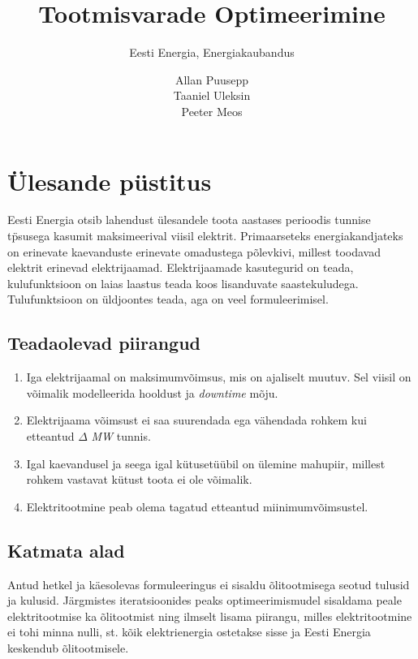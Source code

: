\documentclass[twosided, 11pt, a4paper]{article}
\title{Tootmisvarade Optimeerimine}
\subtitle{Eesti Energia, Energiakaubandus}
\author{Allan Puusepp \\ Taaniel Uleksin \\ Peeter Meos }
\begin{document}
\maketitle

\section{\"Ulesande p\"ustitus}
Eesti Energia otsib  lahendust \"ulesandele toota aastases perioodis tunnise t\"psusega kasumit maksimeerival viisil elektrit. Primaarseteks energiakandjateks on erinevate kaevanduste erinevate omadustega p\~olevkivi, millest toodavad elektrit erinevad elektrijaamad. Elektrijaamade kasutegurid on teada, kulufunktsioon on laias laastus teada koos lisanduvate saastekuludega. Tulufunktsioon on \"uldjoontes teada, aga on veel formuleerimisel.
\subsection{Teadaolevad piirangud}
\begin{enumerate}
\item Iga elektrijaamal on maksimumv\~oimsus, mis on ajaliselt muutuv. Sel viisil on v\~oimalik modelleerida hooldust ja \emph{downtime} m\~oju.
\item Elektrijaama v\~oimsust ei saa suurendada ega v\"ahendada rohkem kui etteantud $\Delta$ \emph{MW} tunnis. 
\item Igal kaevandusel ja seega igal k\"utuset\"u\"ubil on \"ulemine mahupiir, millest rohkem vastavat k\"utust toota ei ole v\~oimalik.
\item Elektritootmine peab olema tagatud etteantud miinimumv\~oimsustel.
\end{enumerate}

\subsection{Katmata alad}
Antud hetkel ja k\"aesolevas formuleeringus ei sisaldu \~olitootmisega seotud tulusid ja kulusid. J\"argmistes iteratsioonides peaks optimeerimismudel sisaldama peale elektritootmise ka \~olitootmist ning ilmselt lisama piirangu, milles elektritootmine ei tohi minna nulli, st. k\~oik elektrienergia ostetakse sisse ja Eesti Energia keskendub \~olitootmisele.
\end{document}
